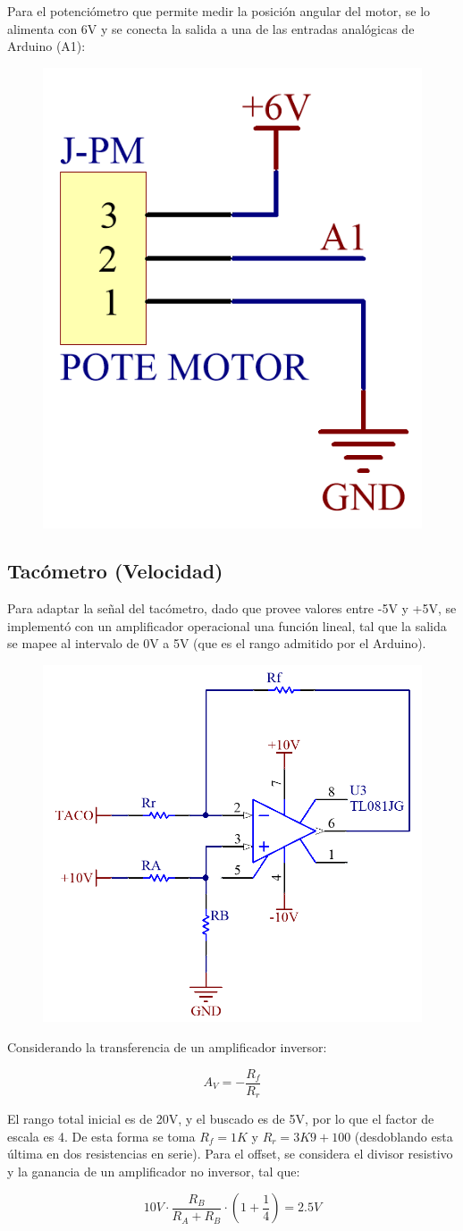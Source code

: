 \documentclass{article}
\begin{document}
Para el potenciómetro que permite medir la posición angular del motor, se lo alimenta con 6V y se conecta la salida a una de las entradas analógicas de Arduino (A1):

\begin{figure}[H]
\centering
\includegraphics[width=0.15\linewidth]{../Images/PoteMotor.png}
\end{figure}

\subsection{Tacómetro (Velocidad)}
Para adaptar la señal del tacómetro, dado que provee valores entre -5V y +5V, se implementó con un amplificador operacional una función lineal, tal que la salida se mapee al intervalo de 0V a 5V (que es el rango admitido por el Arduino).\par

\begin{figure}[H]
\centering
\includegraphics[width=0.4\linewidth]{../Images/ModeloFuncion.png}
\end{figure}

Considerando la transferencia de un amplificador inversor:

\[
A_V = - \frac{R_f}{R_r}
\]

El rango total inicial es de 20V, y el buscado es de 5V, por lo que el factor de escala es 4. De esta forma se toma $R_f = 1K$ y $R_r = 3K9 + 100$ (desdoblando esta última en dos resistencias en serie). Para el offset, se considera el divisor resistivo y la ganancia de un amplificador no inversor, tal que:

\[
10V \cdot \frac{R_B}{R_A + R_B} \cdot \left(1 + \frac{1}{4}\right) = 2.5V
\]
\end{document}
